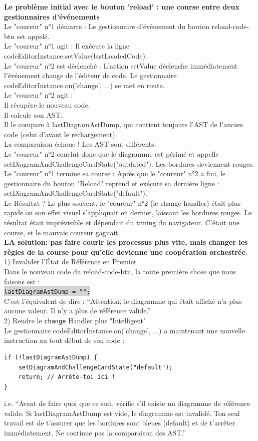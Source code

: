 \documentclass[11pt,a4paper]{article}
\newcommand{\code}[1]{\colorbox{lightgray}{\texttt{\small #1}}}
\begin{document}
\textbf{Le problème initial avec le bouton 'reload' : une course entre deux gestionnaires d'événements}\\
Le "coureur" n°1 démarre : Le gestionnaire d'événement du bouton reload-code-btn est appelé.\\
Le "coureur" n°1 agit : Il exécute la ligne codeEditorInstance.setValue(lastLoadedCode).\\
Le "coureur" n°2 est déclenché : L'action setValue déclenche immédiatement l'événement change de l'éditeur de code. Le gestionnaire codeEditorInstance.on('change', ...) se met en route.\\
Le "coureur" n°2 agit :\\
Il récupère le nouveau code.\\
Il calcule son AST.\\
Il le compare à lastDiagramAstDump, qui contient toujours l'AST de l'ancien code (celui d'avant le rechargement).\\
La comparaison échoue ! Les AST sont différents.\\
Le "coureur" n°2 conclut donc que le diagramme est périmé et appelle setDiagramAndChallengeCardState("outdated"). Les bordures deviennent rouges.\\
Le "coureur" n°1 termine sa course : Après que le "coureur" n°2 a fini, le gestionnaire du bouton "Reload" reprend et exécute sa dernière ligne : setDiagramAndChallengeCardState("default").\\
Le Résultat ? Le plus souvent, le "coureur" n°2 (le change handler) était plus rapide ou son effet visuel s'appliquait en dernier, laissant les bordures rouges. Le résultat était imprévisible et dépendait du timing du navigateur. C'était une course, et le mauvais coureur gagnait.\\
\textbf{LA solution: pas faire courir les processus plus vite, mais changer les règles de la course pour qu'elle devienne une coopération orchestrée.}\\
1) Invalider l'État de Référence en Premier\\
Dans le nouveau code du reload-code-btn, la toute première chose que nous faisons est :\\
\code{lastDiagramAstDump = "";}\\
C'est l'équivalent de dire : ``Attention, le diagramme qui était affiché n'a plus aucune valeur. Il n'y a plus de référence valide.''\\
2) Rendre le \texttt{change} Handler plus "Intelligent"\\
Le gestionnaire codeEditorInstance.on('change', ...) a maintenant une nouvelle instruction au tout début de son code :\\
\begin{verbatim}
if (!lastDiagramAstDump) {
    setDiagramAndChallengeCardState("default");
    return; // Arrête-toi ici !
}
\end{verbatim}
i.e. ``Avant de faire quoi que ce soit, vérifie s'il existe un diagramme de référence valide. Si lastDiagramAstDump est vide, le diagramme est invalidé. Ton seul travail est de t'assurer que les bordures sont bleues (default) et de t'arrêter immédiatement. Ne continue pas la comparaison des AST.''
\end{document}
